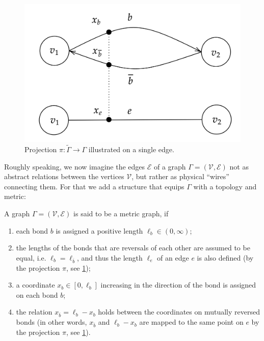 \begin{figure}[H]
    \begin{center}
        \includegraphics[scale=0.2]{img/diagram-20220201_3.png}
    \end{center}
    \caption{Projection $\pi \colon \widetilde{\Gamma} \to \Gamma$ illustrated on a single edge.}
    \label{fig3}
\end{figure}

Roughly speaking, we now imagine the edges $\mathcal{E}$ of a graph $\Gamma = (\mathcal{V}, \mathcal{E})$ not as abstract relations between the vertices $\mathcal{V}$, but rather as physical “wires” connecting them. For that we add a structure that equips $\Gamma$ with a topology and metric:

\begin{definition}
    \label{metric graph}
    A graph $\Gamma = (\mathcal{V}, \mathcal{E})$ is said to be a metric graph, if 
    \begin{enumerate}
        \item each bond $b$ is assigned a positive length $\ell_b \in (0, \infty)$;
        \item the lengths of the bonds that are reversals of each other are assumed to be equal, i.e. $\ell_b = \ell_{\overline{b}}$, and thus the length $\ell_e$ of an edge $e$ is also defined (by the projection $\pi$, see \cref{fig3});
        \item a coordinate $x_b \in [0, \ell_b]$ increasing in the direction of the bond is assigned on each bond $b$;
        \item the relation $x_{\overline{b}} = \ell_b − x_b$ holds between the coordinates on mutually reversed bonds (in other words, $x_{\overline{b}}$ and $\ell_b − x_b$ are mapped to the same point on $e$ by the projection $\pi$, see \cref{fig3}).
    \end{enumerate}
\end{definition}

